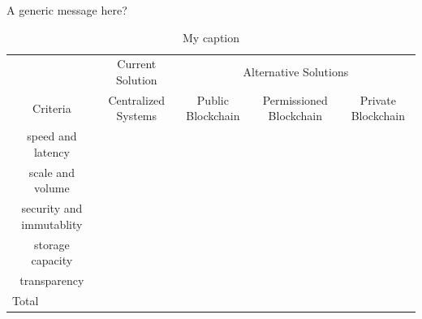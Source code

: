 \begin{warpHTML}

A generic message here? 

\begin{table}
\centering
\caption{My caption}
\begin{tabular}{cllll}
\multicolumn{1}{l}{}      & \multicolumn{1}{c}{Current Solution}    & \multicolumn{3}{c}{Alternative Solutions}                                                                                    \\
Criteria                  & \multicolumn{1}{c}{Centralized Systems} & \multicolumn{1}{c}{Public Blockchain} & \multicolumn{1}{c}{Permissioned Blockchain} & \multicolumn{1}{c}{Private Blockchain} \\
speed and latency         &                                         &                                       &                                             &                                        \\
scale and volume          &                                         &                                       &                                             &                                        \\
security and immutablity  &                                         &                                       &                                             &                                        \\
storage capacity          &                                         &                                       &                                             &                                        \\
transparency              &                                         &                                       &                                             &                                        \\
\multicolumn{1}{l}{Total} &                                         &                                       &                                             &                                       
\end{tabular}
\end{table}
\end{warpHTML}


